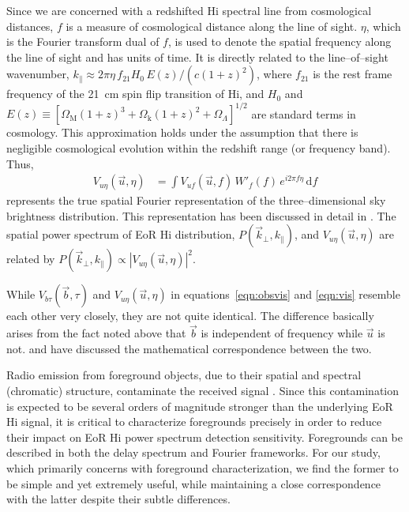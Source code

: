 \documentclass[preprint2,iop,numberedappendix]{emulateapj}
\newcommand{\dif}{\mathrm{d}}
\begin{document}
Since we are concerned with a redshifted H{\sc i} spectral line from cosmological distances, $f$ is a measure of cosmological distance along the line of sight. $\eta$, which is the Fourier transform dual of $f$, is used to denote the spatial frequency along the line of sight and has units of time. It is directly related to the line--of--sight wavenumber, $k_\parallel\approx 2\pi\eta\,f_{21}H_0\,E(z)/(c(1+z)^2)$, where $f_{21}$ is the rest frame frequency of the 21~cm spin flip transition of H{\sc i}, and $H_0$ and $E(z)\equiv [\Omega_\textrm{M}(1+z)^3+\Omega_\textrm{k}(1+z)^2+\Omega_\Lambda]^{1/2}$ are standard terms in cosmology. This approximation holds under the assumption that there is negligible cosmological evolution within the redshift range (or frequency band). Thus,
\begin{align}\label{eqn:los-transform}
  V_{u\eta}(\vec{u},\eta) &= \int V_{uf}(\vec{u},f)\,W'_f(f)\,e^{i2\pi f\eta}\,\dif f
\end{align}
represents the true spatial Fourier representation of the three--dimensional sky brightness distribution. This representation has been discussed in detail in \citet{mor04}. The spatial power spectrum of EoR H{\sc i} distribution, $P(\vec{k}_\perp,k_\parallel)$, and $V_{u\eta}(\vec{u},\eta)$ are related by $P(\vec{k}_\perp,k_\parallel)\propto |V_{u\eta}(\vec{u},\eta)|^2$. 

While $V_{b\tau}(\vec{b},\tau)$ and $V_{u\eta}(\vec{u},\eta)$ in equations~\ref{eqn:obsvis} and \ref{eqn:vis} resemble each other very closely, they are not quite identical. The difference basically arises from the fact noted above that $\vec{b}$ is independent of frequency while $\vec{u}$ is not. \citet{par12} and \citet{liu14a} have discussed the mathematical correspondence between the two. 

Radio emission from foreground objects, due to their spatial and spectral (chromatic) structure, contaminate the received signal \citep{bow09,dat10,mor12,tro12,thy13,liu14a,liu14b}. Since this contamination is expected to be several orders of magnitude stronger than the underlying EoR H{\sc i} signal, it is critical to characterize foregrounds precisely in order to reduce their impact on EoR H{\sc i} power spectrum detection sensitivity. Foregrounds can be described in both the delay spectrum and Fourier frameworks. For our study, which primarily concerns with foreground characterization, we find the former to be simple and yet extremely useful, while maintaining a close correspondence with the latter despite their subtle differences. 
\end{document}
